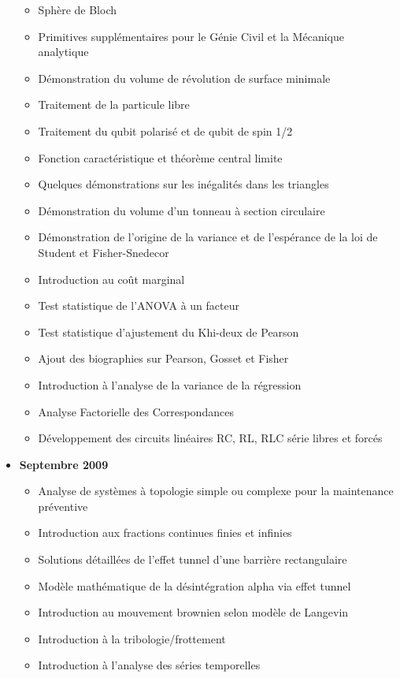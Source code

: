 \documentclass[12pt,a4paper,twoside,openright]{report}
\theoremstyle{definition}
\theoremstyle{itexmp}
\numberwithin{equation}{section}
\begin{document}
\begin{itemize}
\begin{itemize}[noitemsep]
				\item Sphère de Bloch
				\item Primitives supplémentaires pour le Génie Civil et la Mécanique analytique
				\item Démonstration du volume de révolution de surface minimale
				\item Traitement de la particule libre
				\item Traitement du qubit polarisé et de qubit de spin 1/2
				\item Fonction caractéristique et théorème central limite
				\item Quelques démonstrations sur les inégalités dans les triangles
				\item Démonstration du volume d'un tonneau à section circulaire
				\item Démonstration de l'origine de la variance et de l'espérance de la loi de Student et Fisher-Snedecor
				\item Introduction au coût marginal
				\item Test statistique de l'ANOVA à un facteur
				\item Test statistique d'ajustement du Khi-deux de Pearson
				\item Ajout des biographies sur Pearson, Gosset et Fisher
				\item Introduction à l'analyse de la variance de la régression
				\item Analyse Factorielle des Correspondances
				\item Développement des circuits linéaires RC, RL, RLC série libres et forcés
			\end{itemize}
		\item \textbf{Septembre 2009}
			\begin{itemize}[noitemsep]
				\item Analyse de systèmes à topologie simple ou complexe pour la maintenance préventive
				\item Introduction aux fractions continues finies et infinies
				\item Solutions détaillées de l'effet tunnel d'une barrière rectangulaire
				\item Modèle mathématique de la désintégration alpha via effet tunnel
				\item Introduction au mouvement brownien selon modèle de Langevin
				\item Introduction à la tribologie/frottement
				\item Introduction à l'analyse des séries temporelles

\end{itemize}
\end{itemize}
\end{document}
